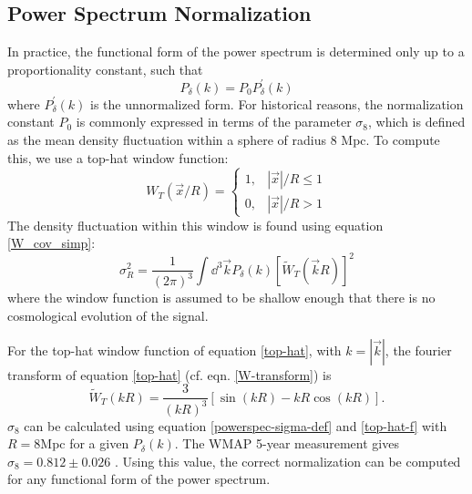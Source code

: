 \subsection{Power Spectrum Normalization}
In practice, the functional form of the power spectrum is determined only
up to a proportionality constant, such that
\begin{equation}
  P_\delta(k) = P_0 P^\prime_\delta(k)
\end{equation}
where $P^\prime_\delta(k)$ is the unnormalized form.
For historical reasons, the normalization constant $P_0$ is commonly 
expressed in terms of the parameter $\sigma_8$, 
which is defined as the mean density 
fluctuation within a sphere of radius 8 Mpc.  To compute this, we use a 
top-hat window function:
\begin{equation}
\label{top-hat}
  W_T(\vec{x}/R) = \left\{
    \begin{array}{ll}
      1, & |\vec x|/R \le 1 \\
      0, & |\vec x|/R > 1
    \end{array}
    \right.
\end{equation} 
The density fluctuation within this window is found using equation \ref{W_cov_simp}:
\begin{equation}
  \label{powerspec-sigma-def}
  \sigma_R^2 = \frac{1}{(2\pi)^3}\int \dd^3\vec{k} 
  P_\delta(k) [\widetilde{W}_T(\vec{k}R)]^2
\end{equation}
where the window function is assumed to be shallow enough that there is no
cosmological evolution of the signal.

For the top-hat window function of equation \ref{top-hat}, with 
$k = |\vec{k}|$,
the fourier transform of equation \ref{top-hat} (cf. eqn. \ref{W-transform}) is
\begin{equation}
  \label{top-hat-f}
  \widetilde{W}_T(kR) = \frac{3}{(kR)^3}\left[\sin(kR) - kR\cos(kR) \right].
\end{equation}
$\sigma_8$ can be calculated using equation \ref{powerspec-sigma-def}
and \ref{top-hat-f} with $R=8$Mpc for a given $P_\delta(k)$. 
The WMAP 5-year measurement gives $\sigma_8 = 0.812 \pm 0.026$ 
\citep{Hinshaw09}.  Using this value, the correct normalization 
can be computed for any functional form of the power spectrum.

